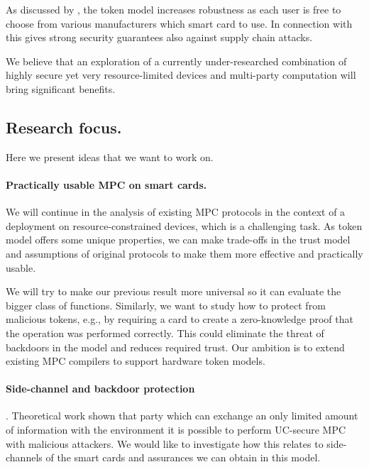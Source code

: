 \documentclass[
  digital, %
  twoside, %
  table,   %
  lof,     %
  lot,     %
]{fithesis3}
\theoremstyle{definition}
\theoremstyle{remark}
\begin{document}
As discussed by \cite{K07}, the token model increases robustness as each user is free to choose from various manufacturers which smart card to use. In connection with \cite{2017-ccs-nemec} this gives strong security guarantees also against supply chain attacks.

We believe that an exploration of a currently under-researched combination of highly secure yet very resource-limited devices and multi-party computation will bring significant benefits.

\subsection{Research focus.}
Here we present ideas that we want to work on.

\paragraph{Practically usable MPC on smart cards.}
We will continue in the analysis of existing MPC protocols in the context of a deployment on resource-constrained devices, which is a challenging task.
As token model offers some unique properties, we can make trade-offs in the trust model and assumptions of original protocols to make them more effective and practically usable. 

We will try to make our previous result \cite{2017-ccs-mavroudis} more universal so it can evaluate the bigger class of functions. Similarly, we want to study how to protect from malicious tokens, e.g., by requiring a card to create a zero-knowledge proof that the operation was performed correctly. This could eliminate the threat of backdoors in the model and reduces required trust.
Our ambition is to extend existing MPC compilers to support hardware token models.

\paragraph{Side-channel and backdoor protection}.
Theoretical work \cite{DNW09} shown that party which can exchange an only limited amount of information with the environment it is possible to perform UC-secure MPC with malicious attackers. We would like to investigate how this relates to side-channels of the smart cards and assurances we can obtain in this model.
\end{document}
